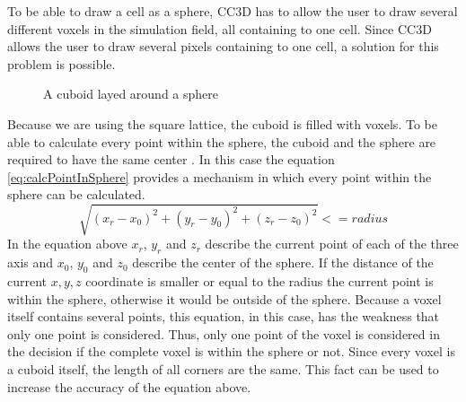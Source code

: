 To be able to draw a cell as a sphere, \ac{CC3D} has to allow the user to draw several different voxels in the simulation field, all containing to one cell. Since \ac{CC3D} allows the user to draw several pixels containing to one cell, a solution for this problem is possible.


\begin{figure}
\begin{center}
\caption{A cuboid layed around a sphere}
\label{tikz:SphereInCube}
\end{center}
\end{figure}


Because we are using the square lattice, the cuboid is filled with voxels. To be able to calculate every point within the sphere, the cuboid and the sphere are required to have the same center \cite{REF}. In this case the equation \ref{eq:calcPointInSphere} provides a mechanism in which every point within the sphere can be calculated.
\begin{equation}\label{eq:calcPointInSphere}
\sqrt{(x_{r}-x_{0})^2 + (y_{r}-y_{0})^2 + (z_{r}-z_{0})^2} <= radius
\end{equation}
In the equation above $x_{r}$, $y_{r}$ and $z_{r}$ describe the current point of each of the three axis and $x_{0}$, $y_{0}$ and $z_{0}$ describe the center of the sphere. If the distance of the current $x, y, z$ coordinate is smaller or equal to the radius the current point is within the sphere, otherwise it would be outside of the sphere.
Because a voxel itself contains several points, this equation, in this case, has the weakness that only one point is considered. Thus, only one point of the voxel is considered in the decision if the complete voxel is within the sphere or not. Since every voxel is a cuboid itself, the length of all corners are the same. This fact can be used to increase the accuracy  of the equation above.

